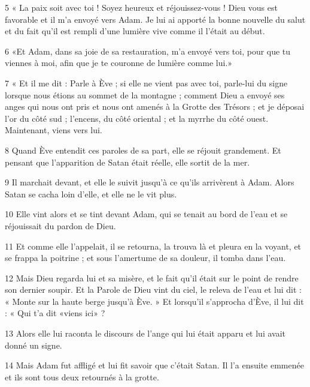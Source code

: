 \par 5 « La paix soit avec toi ! Soyez heureux et réjouissez-vous ! Dieu vous est favorable et il m'a envoyé vers Adam. Je lui ai apporté la bonne nouvelle du salut et du fait qu’il est rempli d’une lumière vive comme il l’était au début.

\par 6 «Et Adam, dans sa joie de sa restauration, m'a envoyé vers toi, pour que tu viennes à moi, afin que je te couronne de lumière comme lui.»

\par 7 « Et il me dit : Parle à Ève ; si elle ne vient pas avec toi, parle-lui du signe lorsque nous étions au sommet de la montagne ; comment Dieu a envoyé ses anges qui nous ont pris et nous ont amenés à la Grotte des Trésors ; et je déposai l'or du côté sud ; l'encens, du côté oriental ; et la myrrhe du côté ouest. Maintenant, viens vers lui.

\par 8 Quand Ève entendit ces paroles de sa part, elle se réjouit grandement. Et pensant que l'apparition de Satan était réelle, elle sortit de la mer.

\par 9 Il marchait devant, et elle le suivit jusqu'à ce qu'ils arrivèrent à Adam. Alors Satan se cacha loin d'elle, et elle ne le vit plus.

\par 10 Elle vint alors et se tint devant Adam, qui se tenait au bord de l'eau et se réjouissait du pardon de Dieu.

\par 11 Et comme elle l'appelait, il se retourna, la trouva là et pleura en la voyant, et se frappa la poitrine ; et sous l'amertume de sa douleur, il tomba dans l'eau.

\par 12 Mais Dieu regarda lui et sa misère, et le fait qu'il était sur le point de rendre son dernier soupir. Et la Parole de Dieu vint du ciel, le releva de l'eau et lui dit : « Monte sur la haute berge jusqu'à Ève. » Et lorsqu'il s'approcha d'Ève, il lui dit : « Qui t'a dit «viens ici» ?

\par 13 Alors elle lui raconta le discours de l'ange qui lui était apparu et lui avait donné un signe.

\par 14 Mais Adam fut affligé et lui fit savoir que c'était Satan. Il l'a ensuite emmenée et ils sont tous deux retournés à la grotte.

